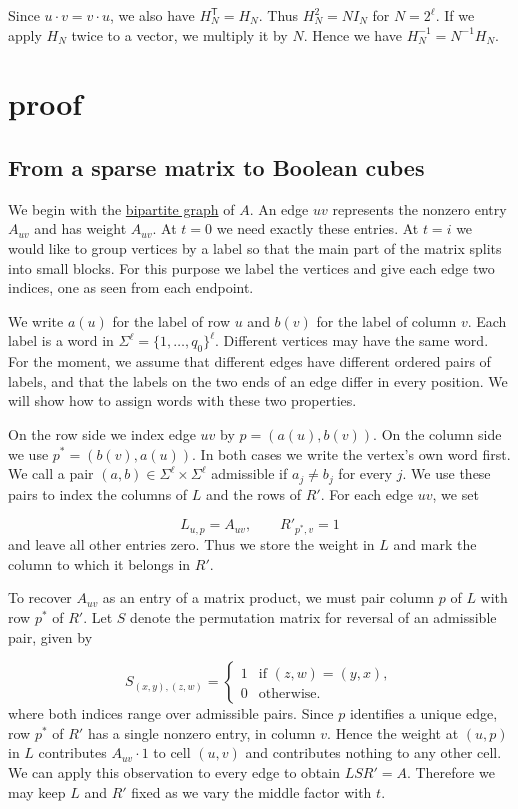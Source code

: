 \documentclass{article}
\theoremstyle{definition}
\begin{document}
Since \(u\cdot v=v\cdot u\), we also have \(H_N^{\mathsf T}=H_N\).
Thus \(H_N^2=NI_N\) for \(N=2^\ell\). If we apply \(H_N\) twice
to a vector, we multiply it by \(N\). Hence we have
\(H_N^{-1}=N^{-1}H_N\).

\section{proof}

\subsection*{From a sparse matrix to Boolean cubes}\label{sec:vertex-words}

We begin with the \hyperref[sec:bipartite-matchings]{bipartite graph}
of \(A\). An edge \(uv\) represents the nonzero entry \(A_{uv}\) and has
weight \(A_{uv}\). At \(t=0\) we need exactly these entries. At \(t=i\)
we would like to group vertices by a label so that the main part of
the matrix splits into small blocks. For this purpose we label the
vertices and give each edge two indices, one as seen from each endpoint.

We write \(a(u)\) for the label of row \(u\) and \(b(v)\) for the label
of column \(v\). Each label is a word in \(\Sigma^\ell=\{1,\ldots,q_0\}^\ell\).
Different vertices may have the same word. For the moment, we assume that
different edges have different ordered pairs of labels, and that the
labels on the two ends of an edge differ in every position. We will
show how to assign words with these two properties.

On the row side we index edge \(uv\) by \(p=(a(u),b(v))\). On the
column side we use \(p^*=(b(v),a(u))\). In both cases we write the
vertex's own word first. We call a pair
\((a,b)\in\Sigma^\ell\times\Sigma^\ell\) admissible if \(a_j\ne b_j\)
for every \(j\). We use these pairs to index the columns of \(L\) and
the rows of \(R'\). For each edge \(uv\), we set

\[
    L_{u,p}=A_{uv},\qquad R'_{p^*,v}=1
\]
and leave all other entries zero. Thus we store the weight in \(L\)
and mark the column to which it belongs in \(R'\).

To recover \(A_{uv}\) as an entry of a matrix product, we must pair
column \(p\) of \(L\) with row \(p^*\) of \(R'\). Let \(S\) denote
the permutation matrix for reversal of an admissible pair, given by

\[
    S_{(x,y),(z,w)}=
    \begin{cases}
      1 & \text{if }(z,w)=(y,x),\\
      0 & \text{otherwise.}
    \end{cases}
\]
where both indices range over admissible pairs. Since \(p\)
identifies a unique edge, row \(p^*\) of \(R'\) has a single nonzero
entry, in column \(v\). Hence the weight at \((u,p)\) in \(L\)
contributes \(A_{uv}\cdot 1\) to cell \((u,v)\) and contributes
nothing to any other cell. We can apply this observation to every edge to obtain \(LSR'=A\).
Therefore we may keep \(L\) and \(R'\) fixed as we vary the middle
factor with \(t\).
\end{document}

